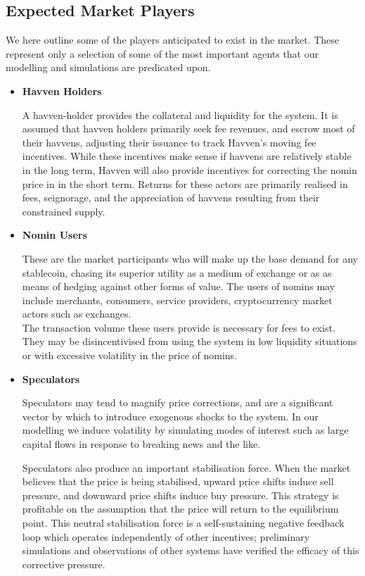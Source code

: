 \subsection{Expected Market Players}

We here outline some of the players anticipated to exist in the
market. These represent only a selection of some of the most important 
agents that our modelling and simulations are predicated upon.

\begin{itemize}
	\item[] \textbf{Havven Holders}

	A havven-holder provides the collateral and liquidity for the system.
	It is assumed that havven holders primarily seek fee revenues, and escrow most of their havvens,
	adjusting their issuance to track Havven's moving fee incentives.
	While these incentives make sense if havvens are relatively stable in the long term,
	Havven will also provide incentives for correcting the nomin price in in the short term.
	Returns for these actors are primarily realised in fees, seignorage, and the appreciation of havvens resulting
	from their constrained supply.

	\item[] \textbf{Nomin Users}

	These are the market participants who will make up the base demand
	for any stablecoin, chasing its superior utility as a medium of exchange or as
	as means of hedging against other forms of value. 
	The users of nomins may include merchants, consumers, service providers, cryptocurrency market actors
	such as exchanges. \\
	The transaction volume these users provide is necessary for fees to exist.
	They may be disincentivised from using the system in low liquidity situations or with excessive volatility
	in the price of nomins.

	\item[] \textbf{Speculators}
	
	Speculators may tend to magnify price corrections, and are a significant vector by which to introduce
	exogenous shocks to the system. In our modelling we induce volatility by simulating modes of interest
	such as large capital flows in response to breaking news and the like.

	Speculators also produce an important stabilisation force. When the market believes that the price is
	being stabilised, upward price shifts induce sell pressure, and downward
	price shifts induce buy pressure. This strategy is profitable on the assumption that the price
	will return to the equilibrium point. This neutral stabilisation force is a self-sustaining
	negative feedback loop which operates independently of other incentives; preliminary simulations and observations of other systems
	have verified the efficacy of this corrective pressure.
	

\end{itemize}
